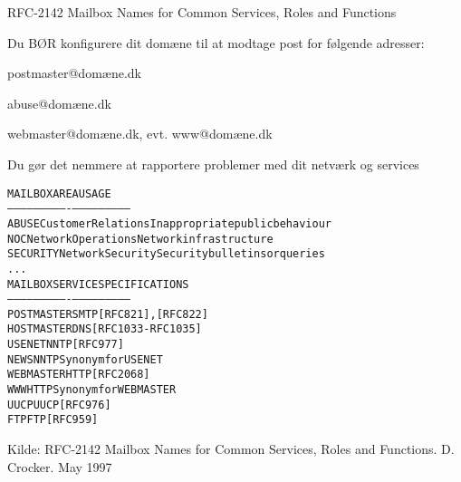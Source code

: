 \documentclass[Screen16to9,17pt]{foils}
\begin{document}

\begin{list1}
\item RFC-2142 Mailbox Names for Common Services, Roles and Functions
\item Du BØR konfigurere dit domæne til at modtage post for følgende adresser:
\begin{list2}
\item postmaster@domæne.dk
\item abuse@domæne.dk
\item webmaster@domæne.dk, evt. www@domæne.dk
\end{list2}
\item Du gør det nemmere at rapportere problemer med dit netværk og services
\end{list1}


\begin{alltt}\small
MAILBOX       AREA                USAGE
-----------   ----------------    ---------------------------
ABUSE         Customer Relations  Inappropriate public behaviour
NOC           Network Operations  Network infrastructure
SECURITY      Network Security    Security bulletins or queries
...
MAILBOX       SERVICE             SPECIFICATIONS
-----------   ----------------    ---------------------------
POSTMASTER    SMTP                [RFC821], [RFC822]
HOSTMASTER    DNS                 [RFC1033-RFC1035]
USENET        NNTP                [RFC977]
NEWS          NNTP                Synonym for USENET
WEBMASTER     HTTP                [RFC 2068]
WWW           HTTP                Synonym for WEBMASTER
UUCP          UUCP                [RFC976]
FTP           FTP                 [RFC959]
\end{alltt}

Kilde:
RFC-2142 Mailbox Names for Common Services, Roles and Functions. D.
Crocker. May 1997




{\small{}}



\end{document}
